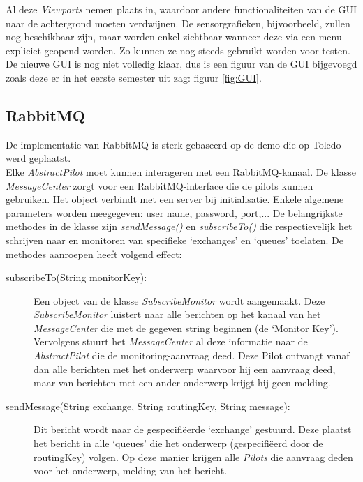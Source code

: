 \documentclass[tt1]{penoverslag}
\begin{document}
Al deze \textit{Viewports} nemen plaats in, waardoor andere functionaliteiten van de GUI naar de achtergrond moeten verdwijnen. De sensorgrafieken, bijvoorbeeld, zullen nog beschikbaar zijn, maar worden enkel zichtbaar wanneer deze via een menu expliciet geopend worden. Zo kunnen ze nog steeds gebruikt worden voor testen.\\

De nieuwe GUI is nog niet volledig klaar, dus is een figuur van de GUI bijgevoegd zoals deze er in het eerste semester uit zag: figuur \ref{fig:GUI}.

\subsection{RabbitMQ}
\label{ssec:RabbMQ}
De implementatie van RabbitMQ \cite{RabbitMQ} is sterk gebaseerd op de demo die op Toledo werd geplaatst.\\

Elke \textit{AbstractPilot} moet kunnen interageren met een RabbitMQ-kanaal. De klasse \textit{MessageCenter} zorgt voor een RabbitMQ-interface die de pilots kunnen gebruiken. Het object verbindt met een server bij initialisatie. Enkele algemene parameters worden meegegeven: user name, password, port,... De belangrijkste methodes in de klasse zijn \textit{sendMessage()} en \textit{subscribeTo()} die respectievelijk het schrijven naar en monitoren van specifieke `exchanges' en `queues' toelaten. De methodes aanroepen heeft volgend effect:\\

\begin{description}
\item[subscribeTo(String monitorKey):] Een object van de klasse \textit{SubscribeMonitor} wordt aangemaakt. Deze \textit{SubscribeMonitor} luistert naar alle berichten op het kanaal van het \textit{MessageCenter} die met de gegeven string beginnen (de `Monitor Key'). Vervolgens stuurt het \textit{MessageCenter} al deze informatie naar de \textit{AbstractPilot} die de monitoring-aanvraag deed. Deze Pilot ontvangt vanaf dan alle berichten met het onderwerp waarvoor hij een aanvraag deed, maar van berichten met een ander onderwerp krijgt hij geen melding.
\item[sendMessage(String exchange, String routingKey, String message):] Dit bericht wordt naar de gespecifi\"eerde `exchange' gestuurd. Deze plaatst het bericht in alle `queues' die het onderwerp (gespecifi\"eerd door de routingKey) volgen. Op deze manier krijgen alle \textit{Pilots} die aanvraag deden voor het onderwerp, melding van het bericht.
\end{description}
\end{document}
